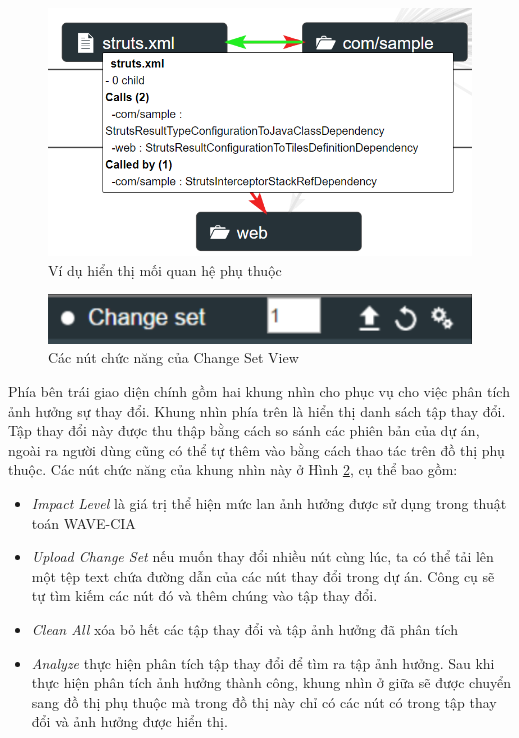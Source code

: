 \documentclass[12pt]{report}
\begin{document}
\begin{figure}[h]
	\centering
	\includegraphics[width=0.6\linewidth]{images/jcia-workspace1}
	\caption{Ví dụ hiển thị mối quan hệ phụ thuộc}
	\label{fig:jcia-workspace1}
\end{figure}

\begin{figure}[h]
	\centering
	\includegraphics[width=0.5\linewidth]{images/jcia-workspace2}
	\caption{Các nút chức năng của Change Set View}
	\label{fig:jcia-workspace2}
\end{figure}

Phía bên trái giao diện chính gồm hai khung nhìn cho phục vụ cho việc phân tích ảnh hưởng sự thay đổi. Khung nhìn phía trên là hiển thị danh sách tập thay đổi. Tập thay đổi này được thu thập bằng cách so sánh các phiên bản của dự án, ngoài ra người dùng cũng có thể tự thêm vào bằng cách thao tác trên đồ thị phụ thuộc. Các nút chức năng của khung nhìn này ở Hình \ref{fig:jcia-workspace2}, cụ thể bao gồm:
\begin{itemize}
	\item \textit{Impact Level} là giá trị thể hiện mức lan ảnh hưởng được sử dụng trong thuật toán WAVE-CIA
	\item \textit{Upload Change Set} nếu muốn thay đổi nhiều nút cùng lúc, ta có thể tải lên
	một tệp text chứa đường dẫn của các nút thay đổi trong dự án. Công cụ sẽ tự tìm kiếm
	các nút đó và thêm chúng vào tập thay đổi.
	\item \textit{Clean All} xóa bỏ hết các tập thay đổi và tập ảnh hưởng đã phân tích
	\item \textit{Analyze} thực hiện phân tích tập thay đổi để tìm ra tập ảnh hưởng. Sau khi thực hiện phân tích ảnh hưởng thành công, khung nhìn ở giữa sẽ được chuyển sang đồ thị phụ thuộc mà trong đồ thị này chỉ có các nút có trong tập thay đổi và ảnh hưởng được hiển thị.
\end{itemize}
\end{document}
